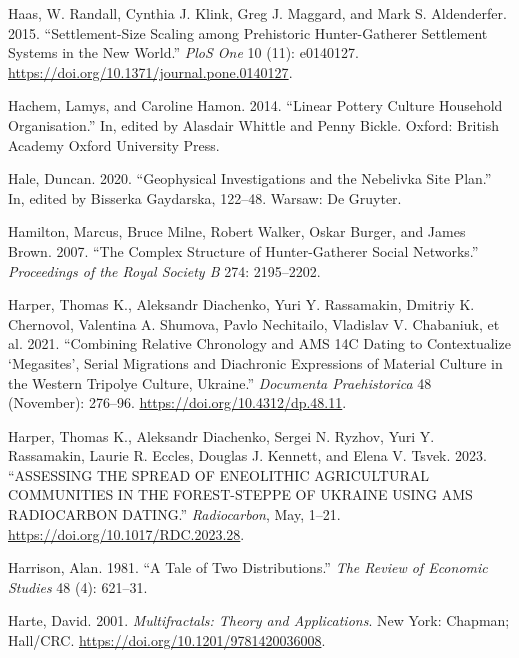\documentclass[
  12pt,
  a4paper, twoside]{book}
\newlength{\cslhangindent}
\newlength{\cslentryspacingunit} %
\newenvironment{CSLReferences}[2] %
 {%
  \setlength{\parindent}{0pt}
  \ifodd #1
  \let\oldpar\par
  \def\par{\hangindent=\cslhangindent\oldpar}
  \fi
  \setlength{\parskip}{#2\cslentryspacingunit}
 }%
 {}
\begin{document}
\begin{CSLReferences}{1}{0}
\leavevmode{}%
Haas, W. Randall, Cynthia J. Klink, Greg J. Maggard, and Mark S. Aldenderfer. 2015. {``Settlement-Size Scaling among Prehistoric Hunter-Gatherer Settlement Systems in the New World.''} \emph{PloS One} 10 (11): e0140127. \url{https://doi.org/10.1371/journal.pone.0140127}.

\leavevmode{}%
Hachem, Lamys, and Caroline Hamon. 2014. {``Linear Pottery Culture Household Organisation.''} In, edited by Alasdair Whittle and Penny Bickle. Oxford: British Academy Oxford University Press.

\leavevmode{}%
Hale, Duncan. 2020. {``Geophysical Investigations and the Nebelivka Site Plan.''} In, edited by Bisserka Gaydarska, 122--48. Warsaw: De Gruyter.

\leavevmode{}%
Hamilton, Marcus, Bruce Milne, Robert Walker, Oskar Burger, and James Brown. 2007. {``The Complex Structure of Hunter-Gatherer Social Networks.''} \emph{Proceedings of the Royal Society B} 274: 2195--2202.

\leavevmode{}%
Harper, Thomas K., Aleksandr Diachenko, Yuri Y. Rassamakin, Dmitriy K. Chernovol, Valentina A. Shumova, Pavlo Nechitailo, Vladislav V. Chabaniuk, et al. 2021. {``Combining Relative Chronology and AMS 14C Dating to Contextualize {`}Megasites{'}, Serial Migrations and Diachronic Expressions of Material Culture in the Western Tripolye Culture, Ukraine.''} \emph{Documenta Praehistorica} 48 (November): 276--96. \url{https://doi.org/10.4312/dp.48.11}.

\leavevmode{}%
Harper, Thomas K., Aleksandr Diachenko, Sergei N. Ryzhov, Yuri Y. Rassamakin, Laurie R. Eccles, Douglas J. Kennett, and Elena V. Tsvek. 2023. {``ASSESSING THE SPREAD OF ENEOLITHIC AGRICULTURAL COMMUNITIES IN THE FOREST-STEPPE OF UKRAINE USING AMS RADIOCARBON DATING.''} \emph{Radiocarbon}, May, 1--21. \url{https://doi.org/10.1017/RDC.2023.28}.

\leavevmode{}%
Harrison, Alan. 1981. {``A Tale of Two Distributions.''} \emph{The Review of Economic Studies} 48 (4): 621--31.

\leavevmode{}%
Harte, David. 2001. \emph{Multifractals: Theory and Applications}. New York: Chapman; Hall/CRC. \url{https://doi.org/10.1201/9781420036008}.


\end{CSLReferences}
\end{document}

